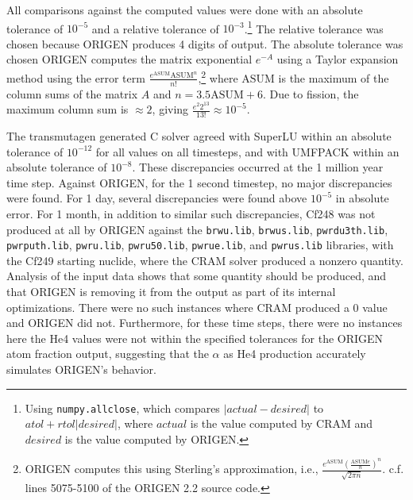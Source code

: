 All comparisons against the computed values were done with an absolute
tolerance of $10^{-5}$ and a relative tolerance of $10^{-3}$.\footnote{Using
  \texttt{numpy.\allowbreak{}allclose}, which compares $|actual -
  desired|$ to $atol + rtol|desired|$,
  where $actual$ is the value computed by CRAM and $desired$ is the
  value computed by ORIGEN.} The relative tolerance was chosen because ORIGEN
produces 4 digits of output. The absolute tolerance was chosen ORIGEN computes
the matrix exponential $e^{-A}$ using a Taylor expansion method using the error term
$\frac{e^{\mathrm{ASUM}}\mathrm{ASUM}^n}{n!}$,\footnote{ORIGEN computes this using
    Sterling's approximation, i.e.,
    $\frac{e^{\mathrm{ASUM}}(\frac{\mathrm{ASUM}e}{n})^n}{\sqrt{2\pi
      n}}$. c.f. lines 5075-5100 of the ORIGEN 2.2 source code.} where
$\mathrm{ASUM}$ is the maximum of the column sums of the matrix $A$ and $n =
3.5\mathrm{ASUM} + 6$. Due to fission, the maximum
column sum is $\approx 2$, giving $\frac{e^{2}2^{13}}{13!}\approx 10^{-5}$.

The transmutagen generated C solver agreed with SuperLU within an absolute
tolerance of $10^{-12}$ for all values on all timesteps, and with UMFPACK
within an absolute tolerance of $10^{-8}$. These discrepancies occurred at
the 1 million year time step. Against ORIGEN, for the 1 second timestep, no
major discrepancies were found. For 1 day, several discrepancies were found
above $10^{-5}$ in absolute error. For 1 month, in addition to similar such
discrepancies, Cf248 was not produced at all by ORIGEN against the
\texttt{brwu.\allowbreak{}lib}, \texttt{brwus.\allowbreak{}lib},
\texttt{pwrdu3th.\allowbreak{}lib}, \texttt{pwrputh.\allowbreak{}lib},
\texttt{pwru.\allowbreak{}lib}, \texttt{pwru50.\allowbreak{}lib},
\texttt{pwrue.\allowbreak{}lib}, and \texttt{pwrus.\allowbreak{}lib}
libraries, with the Cf249 starting nuclide, where the CRAM solver produced a
nonzero quantity. Analysis of the input data shows that some quantity should
be produced, and that ORIGEN is removing it from the output as part of its
internal optimizations. There were no such instances where CRAM produced a 0
value and ORIGEN did not. Furthermore, for these time steps, there were no
instances here the He4 values were not within the specified tolerances for the
ORIGEN atom fraction output, suggesting that the $\alpha$ as He4 production
accurately simulates ORIGEN's behavior.
